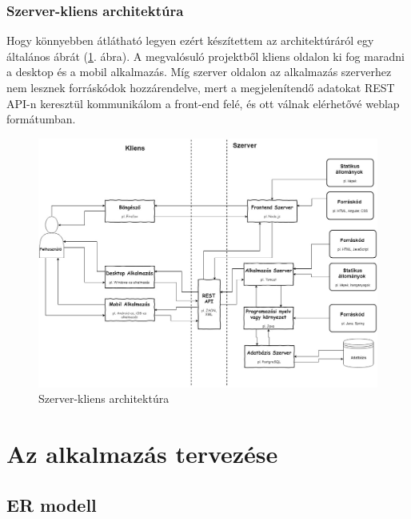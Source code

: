 

\subsubsection{Szerver-kliens architektúra}

Hogy könnyebben átlátható legyen ezért készítettem az architektúráról egy általános ábrát (\ref{fig:architecture}. ábra). 
A megvalósuló projektből kliens oldalon ki fog maradni a desktop és a mobil alkalmazás. Míg szerver oldalon az alkalmazás szerverhez nem lesznek forráskódok hozzárendelve, mert a megjelenítendő adatokat REST API-n keresztül kommunikálom a front-end felé, és ott válnak elérhetővé weblap formátumban.

\begin{figure}
\centering
\includegraphics[scale=0.365]{kepek/architecture.jpg}
\caption{Szerver-kliens architektúra}
\label{fig:architecture}
\end{figure}

\section{Az alkalmazás tervezése}

\subsection{ER modell}

